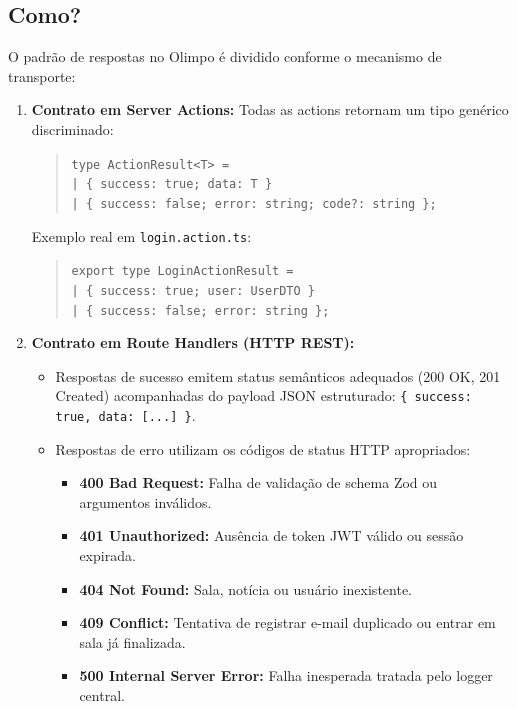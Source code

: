\documentclass[12pt,a4paper]{article}
\begin{document}
\subsection{Como?}
O padrão de respostas no Olimpo é dividido conforme o mecanismo de transporte:
\begin{enumerate}
  \item \textbf{Contrato em Server Actions:}
  Todas as actions retornam um tipo genérico discriminado:
  \begin{quote}
    \texttt{type ActionResult<T> = \\
    \quad | \{ success: true; data: T \}\\
    \quad | \{ success: false; error: string; code?: string \};}
  \end{quote}
  Exemplo real em \texttt{login.action.ts}:
  \begin{quote}
    \texttt{export type LoginActionResult =\\
    \quad | \{ success: true; user: UserDTO \}\\
    \quad | \{ success: false; error: string \};}
  \end{quote}
  \item \textbf{Contrato em Route Handlers (HTTP REST):}
  \begin{itemize}
    \item Respostas de sucesso emitem status semânticos adequados (200 OK, 201 Created) acompanhadas do payload JSON estruturado: \texttt{\{ success: true, data: [...] \}}.
    \item Respostas de erro utilizam os códigos de status HTTP apropriados:
    \begin{itemize}
      \item \textbf{400 Bad Request:} Falha de validação de schema Zod ou argumentos inválidos.
      \item \textbf{401 Unauthorized:} Ausência de token JWT válido ou sessão expirada.
      \item \textbf{404 Not Found:} Sala, notícia ou usuário inexistente.
      \item \textbf{409 Conflict:} Tentativa de registrar e-mail duplicado ou entrar em sala já finalizada.
      \item \textbf{500 Internal Server Error:} Falha inesperada tratada pelo logger central.
    \end{itemize}
  \end{itemize}
\end{enumerate}

\end{document}
